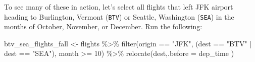 \documentclass[
  letterpaper,
  DIV=11,
  numbers=noendperiod]{scrartcl}
\newenvironment{Shaded}{\begin{snugshade}}{\end{snugshade}}
\newcommand{\AttributeTok}[1]{\textcolor[rgb]{0.40,0.45,0.13}{#1}}
\newcommand{\DecValTok}[1]{\textcolor[rgb]{0.68,0.00,0.00}{#1}}
\newcommand{\FunctionTok}[1]{\textcolor[rgb]{0.28,0.35,0.67}{#1}}
\newcommand{\NormalTok}[1]{\textcolor[rgb]{0.00,0.23,0.31}{#1}}
\newcommand{\OtherTok}[1]{\textcolor[rgb]{0.00,0.23,0.31}{#1}}
\newcommand{\SpecialCharTok}[1]{\textcolor[rgb]{0.37,0.37,0.37}{#1}}
\newcommand{\StringTok}[1]{\textcolor[rgb]{0.13,0.47,0.30}{#1}}
\begin{document}
To see many of these in action, let's select all flights that left JFK
airport heading to Burlington, Vermont (\texttt{BTV}) or Seattle,
Washington (\texttt{SEA}) in the months of October, November, or
December. Run the following:

\begin{Shaded}
\begin{Highlighting}[]
\NormalTok{btv\_sea\_flights\_fall }\OtherTok{\textless{}{-}}\NormalTok{ flights }\SpecialCharTok{\%\textgreater{}\%}
  \FunctionTok{filter}\NormalTok{(origin }\SpecialCharTok{==} \StringTok{"JFK"}\NormalTok{, (dest }\SpecialCharTok{==} \StringTok{"BTV"} \SpecialCharTok{|}\NormalTok{ dest }\SpecialCharTok{==} \StringTok{"SEA"}\NormalTok{), month }\SpecialCharTok{\textgreater{}=} \DecValTok{10}\NormalTok{) }\SpecialCharTok{\%\textgreater{}\%}
  \FunctionTok{relocate}\NormalTok{(dest,}\AttributeTok{.before =}\NormalTok{ dep\_time )}
\end{Highlighting}
\end{Shaded}
\end{document}
